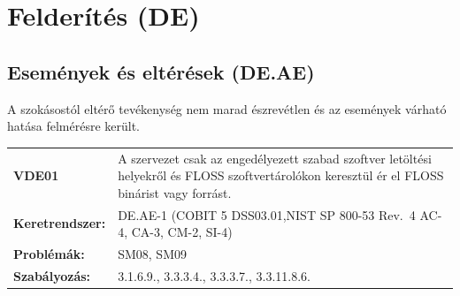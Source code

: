 \documentclass[12pt,magyar,a4paper,oneside]{scrreprt}
\begin{document}
\hypertarget{felderuxedtuxe9s-de}{%
\section{Felderítés (DE)}\label{felderuxedtuxe9s-de}}

\hypertarget{esemuxe9nyek-uxe9s-eltuxe9ruxe9sek-de.ae}{%
\subsection{Események és eltérések
(DE.AE)}\label{esemuxe9nyek-uxe9s-eltuxe9ruxe9sek-de.ae}}

A szokásostól eltérő tevékenység nem marad észrevétlen és az események
várható hatása felmérésre került.

\begin{longtable}[]{@{}ll@{}}
\toprule
\endhead
\begin{minipage}[t]{0.16\columnwidth}\raggedright
\textbf{VDE01}\strut
\end{minipage} & \begin{minipage}[t]{0.79\columnwidth}\raggedright
A szervezet csak az engedélyezett szabad szoftver letöltési helyekről és
FLOSS szoftvertárolókon keresztül ér el FLOSS binárist vagy
forrást.\strut
\end{minipage}\tabularnewline
\begin{minipage}[t]{0.16\columnwidth}\raggedright
\textbf{Keretrendszer:}\strut
\end{minipage} & \begin{minipage}[t]{0.79\columnwidth}\raggedright
DE.AE-1 (COBIT 5 DSS03.01,NIST SP 800-53 Rev.~4 AC-4, CA-3, CM-2,
SI-4)\strut
\end{minipage}\tabularnewline
\begin{minipage}[t]{0.16\columnwidth}\raggedright
\textbf{Problémák:}\strut
\end{minipage} & \begin{minipage}[t]{0.79\columnwidth}\raggedright
SM08, SM09\strut
\end{minipage}\tabularnewline
\begin{minipage}[t]{0.16\columnwidth}\raggedright
\textbf{Szabályozás:}\strut
\end{minipage} & \begin{minipage}[t]{0.79\columnwidth}\raggedright
3.1.6.9., 3.3.3.4., 3.3.3.7., 3.3.11.8.6.\strut
\end{minipage}\tabularnewline
\bottomrule
\end{longtable}
\end{document}
